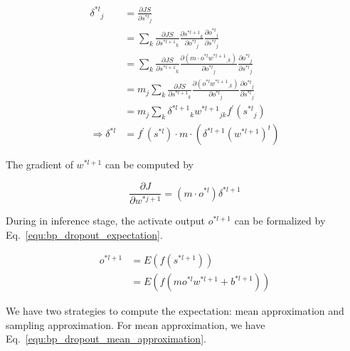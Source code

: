 \documentclass[runningheads,openany]{xhlPaper}
\begin{document}
\begin{equation}
\label{equ:bp_dropout_delta}
\begin{aligned}
{\delta ^{*l}}_j &= \frac{{\partial JS}}{{\partial {s^{*l}}_j}}\\
 &= \sum\limits_k {\frac{{\partial JS}}{{\partial {s^{*l + 1}}_k}}\frac{{\partial {s^{*l + 1}}_k}}{{\partial {o^{*l}}_j}}\frac{{\partial {o^{*l}}_j}}{{\partial {s^{*l}}_j}}} \\
 &= \sum\limits_k {\frac{{\partial JS}}{{\partial {s^{*l + 1}}_k}}\frac{{\partial \left( {m \cdot {o^{*l}}{w^{*l + 1}}_{\_k}} \right)}}{{\partial {o^{*l}}_j}}\frac{{\partial {o^{*l}}_j}}{{\partial {s^{*l}}_j}}} \\
 &= {m_j}\sum\limits_k {\frac{{\partial JS}}{{\partial {s^{*l + 1}}_k}}\frac{{\partial \left( {{o^{*l}}{w^{*l + 1}}_{\_k}} \right)}}{{\partial {o^{*l}}_j}}\frac{{\partial {o^{*l}}_j}}{{\partial {s^{*l}}_j}}} \\
 &= {m_j}\sum\limits_k {{\delta ^{*l + 1}}_k{w^{*l + 1}}_{jk}{f^{'}}\left( {{s^{*l}}_j} \right)} \\
 \Rightarrow {\delta ^{*l}} &= {f^{'}}\left( {{s^{*l}}} \right) \cdot m \cdot \left( {{\delta ^{*l + 1}}{{\left( {{w^{*l + 1}}} \right)}^t}} \right)
\end{aligned}
\end{equation}

The gradient of $w^{*l + 1}$ can be computed by 

\begin{equation}
\label{equ:bp_dropout_gradient}
\frac{{\partial J}}{{\partial {w^{*j + 1}}}} = \left( {m \cdot {o^{*l}}} \right){\delta ^{*l + 1}}
\end{equation}

During in inference stage, the activate output $o^{*l + 1}$ can be formalized by Eq.~\ref{equ:bp_dropout_expectation}.

\begin{equation}
\label{equ:bp_dropout_expectation}
\begin{aligned}
{o^{*l + 1}} &= E\left( {f\left( {{s^{*l + 1}}} \right)} \right)\\
 &= E\left( {f\left( {m{o^{*l}}{w^{*l + 1}} + {b^{*l + 1}}} \right)} \right)
\end{aligned}
\end{equation}

We have two strategies to compute the expectation: mean approximation and sampling approximation. 
For mean approximation, we have Eq.~\ref{equ:bp_dropout_mean_approximation}.
\end{document}

